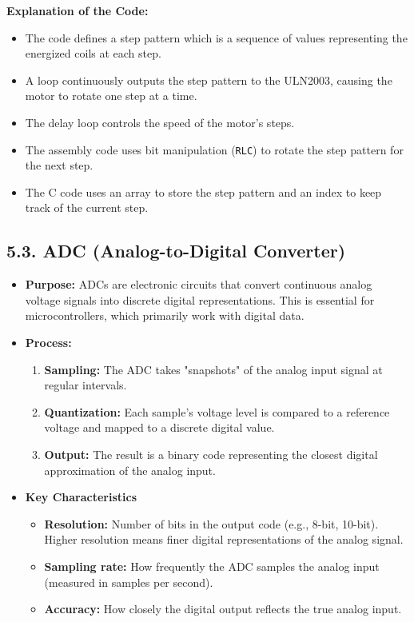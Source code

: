 \documentclass[
]{article}
\begin{document}
\textbf{Explanation of the Code:}

\begin{itemize}
\item
  The code defines a step pattern which is a sequence of values
  representing the energized coils at each step.
\item
  A loop continuously outputs the step pattern to the ULN2003, causing
  the motor to rotate one step at a time.
\item
  The delay loop controls the speed of the motor's steps.
\item
  The assembly code uses bit manipulation (\texttt{RLC}) to rotate the
  step pattern for the next step.
\item
  The C code uses an array to store the step pattern and an index to
  keep track of the current step.
\end{itemize}

\hypertarget{53-adc-analog-to-digital-converter}{%
\subsection{5.3. ADC (Analog-to-Digital
Converter)}\label{53-adc-analog-to-digital-converter}}

\begin{itemize}
\item
  \textbf{Purpose:} ADCs are electronic circuits that convert continuous
  analog voltage signals into discrete digital representations. This is
  essential for microcontrollers, which primarily work with digital
  data.
\item
  \textbf{Process:}

  \begin{enumerate}
  \def\labelenumi{\arabic{enumi}.}
  \item
    \textbf{Sampling:} The ADC takes "snapshots" of the analog input
    signal at regular intervals.
  \item
    \textbf{Quantization:} Each sample's voltage level is compared to a
    reference voltage and mapped to a discrete digital value.
  \item
    \textbf{Output:} The result is a binary code representing the
    closest digital approximation of the analog input.
  \end{enumerate}
\item
  \textbf{Key Characteristics}

  \begin{itemize}
  \item
    \textbf{Resolution:} Number of bits in the output code (e.g., 8-bit,
    10-bit). Higher resolution means finer digital representations of
    the analog signal.
  \item
    \textbf{Sampling rate:} How frequently the ADC samples the analog
    input (measured in samples per second).
  \item
    \textbf{Accuracy:} How closely the digital output reflects the true
    analog input.
  \end{itemize}
\end{itemize}
\end{document}
